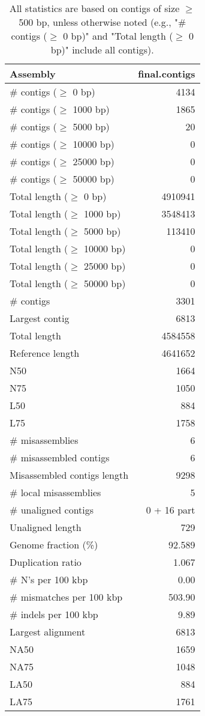\documentclass[12pt,a4paper]{article}
\begin{document}
\begin{table}[ht]
\begin{center}
\caption{All statistics are based on contigs of size $\geq$ 500 bp, unless otherwise noted (e.g., "\# contigs ($\geq$ 0 bp)" and "Total length ($\geq$ 0 bp)" include all contigs).}
\begin{tabular}{|l*{1}{|r}|}
\hline
Assembly & final.contigs \\ \hline
\# contigs ($\geq$ 0 bp) & 4134 \\ \hline
\# contigs ($\geq$ 1000 bp) & 1865 \\ \hline
\# contigs ($\geq$ 5000 bp) & 20 \\ \hline
\# contigs ($\geq$ 10000 bp) & 0 \\ \hline
\# contigs ($\geq$ 25000 bp) & 0 \\ \hline
\# contigs ($\geq$ 50000 bp) & 0 \\ \hline
Total length ($\geq$ 0 bp) & 4910941 \\ \hline
Total length ($\geq$ 1000 bp) & 3548413 \\ \hline
Total length ($\geq$ 5000 bp) & 113410 \\ \hline
Total length ($\geq$ 10000 bp) & 0 \\ \hline
Total length ($\geq$ 25000 bp) & 0 \\ \hline
Total length ($\geq$ 50000 bp) & 0 \\ \hline
\# contigs & 3301 \\ \hline
Largest contig & 6813 \\ \hline
Total length & 4584558 \\ \hline
Reference length & 4641652 \\ \hline
N50 & 1664 \\ \hline
N75 & 1050 \\ \hline
L50 & 884 \\ \hline
L75 & 1758 \\ \hline
\# misassemblies & 6 \\ \hline
\# misassembled contigs & 6 \\ \hline
Misassembled contigs length & 9298 \\ \hline
\# local misassemblies & 5 \\ \hline
\# unaligned contigs & 0 + 16 part \\ \hline
Unaligned length & 729 \\ \hline
Genome fraction (\%) & 92.589 \\ \hline
Duplication ratio & 1.067 \\ \hline
\# N's per 100 kbp & 0.00 \\ \hline
\# mismatches per 100 kbp & 503.90 \\ \hline
\# indels per 100 kbp & 9.89 \\ \hline
Largest alignment & 6813 \\ \hline
NA50 & 1659 \\ \hline
NA75 & 1048 \\ \hline
LA50 & 884 \\ \hline
LA75 & 1761 \\ \hline
\end{tabular}
\end{center}
\end{table}
\end{document}
